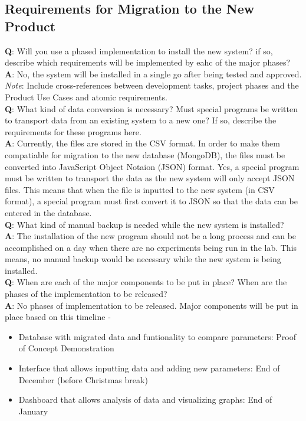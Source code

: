 \documentclass[12pt]{article}
\begin{document}
\subsection{Requirements for Migration to the New Product}
\textbf{Q}: Will you use a phased implementation to install the new system? if so, describe which requirements 
will be implemented by eahc of the major phases?\\
\textbf{A}: No, the system will be installed in a single go after being tested and approved.\\
\emph{Note}: Include cross-references between development tasks, project phases and the Product Use Cases and atomic requirements.\\
\newline
\textbf{Q}: What kind of data conversion is necessary? Must special programs be written to transport data from an 
existing system to a new one? If so, describe the requirements for these programs here.\\
\textbf{A}: Currently, the files are stored in the CSV format. In order to make them compatiable for migration to the 
new database (MongoDB), the files must be converted into JavaScript Object Notaion (JSON) format. Yes, a special program 
must be written to transport the data as the new system will only accept JSON files. This means that when the file is inputted to the new 
system (in CSV format), a special program must first convert it to JSON so that the data can be entered in the database.\\
\newline
\textbf{Q}: What kind of manual backup is needed while the new system is installed?\\
\textbf{A}: The installation of the new program should not be a long process and can be accomplished on a day when there are no experiments
being run in the lab. This means, no manual backup would be necessary while the new system is being installed.\\
\newline
\textbf{Q}: When are each of the major components to be put in place? When are the phases of the implementation to be 
released?\\
\textbf{A}: No phases of implementation to be released. Major components will be put in place based on this timeline - 
\begin{itemize}
  \item Database with migrated data and funtionality to compare parameters: Proof of Concept Demonstration
  \item Interface that allows inputting data and adding new parameters: End of December (before Christmas break)
  \item Dashboard that allows analysis of data and visualizing graphs: End of January 
\end{itemize}
\end{document}
